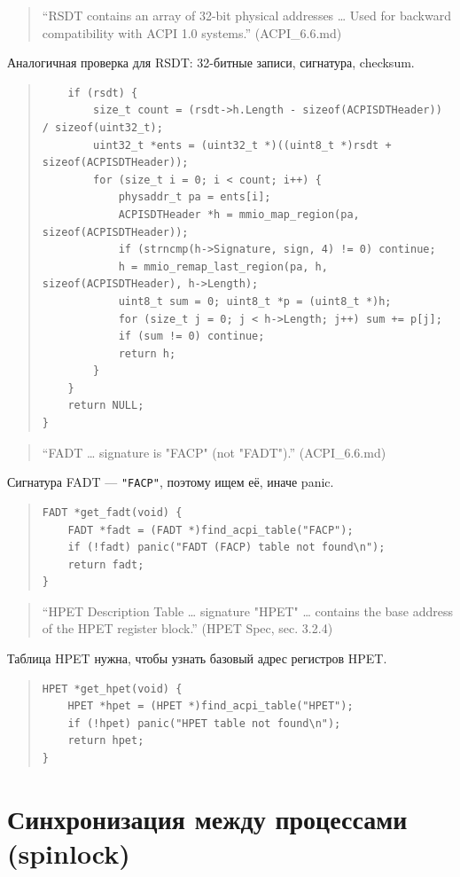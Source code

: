 \documentclass[a4paper,12pt]{article}
\begin{document}
\begin{quote}
``RSDT contains an array of 32-bit physical addresses … Used for backward compatibility with ACPI 1.0 systems.'' (ACPI\_6.6.md)
\end{quote}
Аналогичная проверка для RSDT: 32-битные записи, сигнатура, checksum.
\begin{quote}\begin{verbatim}
    if (rsdt) {
        size_t count = (rsdt->h.Length - sizeof(ACPISDTHeader)) / sizeof(uint32_t);
        uint32_t *ents = (uint32_t *)((uint8_t *)rsdt + sizeof(ACPISDTHeader));
        for (size_t i = 0; i < count; i++) {
            physaddr_t pa = ents[i];
            ACPISDTHeader *h = mmio_map_region(pa, sizeof(ACPISDTHeader));
            if (strncmp(h->Signature, sign, 4) != 0) continue;
            h = mmio_remap_last_region(pa, h, sizeof(ACPISDTHeader), h->Length);
            uint8_t sum = 0; uint8_t *p = (uint8_t *)h;
            for (size_t j = 0; j < h->Length; j++) sum += p[j];
            if (sum != 0) continue;
            return h;
        }
    }
    return NULL;
}
\end{verbatim}\end{quote}

\begin{quote}
``FADT … signature is "FACP" (not "FADT").'' (ACPI\_6.6.md)
\end{quote}
Сигнатура FADT — \texttt{"FACP"}, поэтому ищем её, иначе panic.
\begin{quote}\begin{verbatim}
FADT *get_fadt(void) {
    FADT *fadt = (FADT *)find_acpi_table("FACP");
    if (!fadt) panic("FADT (FACP) table not found\n");
    return fadt;
}
\end{verbatim}\end{quote}

\begin{quote}
``HPET Description Table … signature "HPET" … contains the base address of the HPET register block.'' (HPET Spec, sec. 3.2.4)
\end{quote}
Таблица HPET нужна, чтобы узнать базовый адрес регистров HPET.
\begin{quote}\begin{verbatim}
HPET *get_hpet(void) {
    HPET *hpet = (HPET *)find_acpi_table("HPET");
    if (!hpet) panic("HPET table not found\n");
    return hpet;
}
\end{verbatim}\end{quote}


\section{Синхронизация между процессами (spinlock)}
\end{document}
